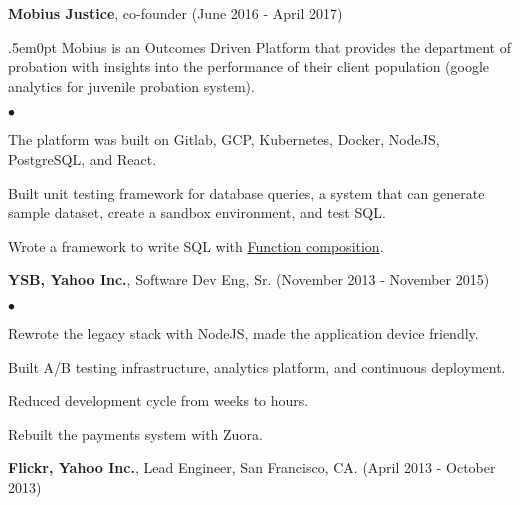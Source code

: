 \documentclass[margin, line, 10pt]{res}
\newenvironment{list2}{
  \begin{list}{$\bullet$}{%
      \setlength{\itemsep}{0in}
      \setlength{\parsep}{0in} \setlength{\parskip}{0in}
      \setlength{\topsep}{0in} \setlength{\partopsep}{0in}
      \setlength{\leftmargin}{0.2in}}}{\end{list}}
\begin{document}
\begin{resume}
\vspace{.05cm}

{\Large {\bf Mobius Justice}}, co-founder \hfill (June 2016 - April 2017)\\
\begin{adjustwidth}{.5em}{0pt}
  \vspace{-.3cm}
  Mobius is an Outcomes Driven Platform that provides the department of probation with insights
into the performance of their client population (google analytics for juvenile probation system).

  \begin{list2}
  \vspace{.2cm}
  \item The platform was built on Gitlab, GCP, Kubernetes, Docker, NodeJS, PostgreSQL, and React.
  \item Built unit testing framework for database queries, a system that can generate sample dataset, create a sandbox environment, and test SQL.
  \item Wrote a framework to write SQL with \href{https://en.wikipedia.org/wiki/Function_composition_(computer_science)}{Function composition}.
  \end{list2}
  \vspace{.05cm}
\end{adjustwidth}


{\Large {\bf YSB, Yahoo Inc.}}, Software Dev Eng, Sr. \hfill (November 2013 - November 2015)\\
\vspace{-.3cm}
\begin{list2}
\vspace{.1cm}
\item Rewrote the legacy stack with NodeJS, made the application device friendly.
\item Built A/B testing infrastructure, analytics platform, and continuous deployment.
\item Reduced development cycle from weeks to hours.
\item Rebuilt the payments system with Zuora.
\end{list2}
\vspace{.05cm}

{\Large {\bf Flickr, Yahoo Inc.}}, Lead Engineer, San Francisco, CA.  \hfill (April 2013 - October 2013)\\
\vspace{-.3cm}


\end{resume}
\end{document}
